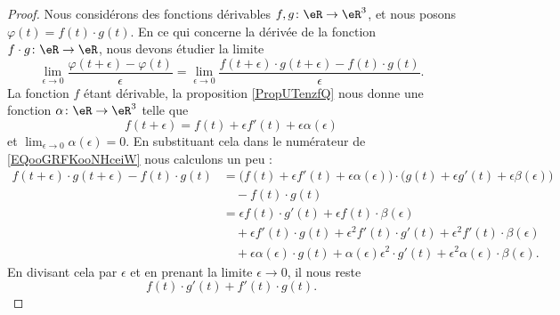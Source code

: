 \begin{proof}
	Nous considérons des fonctions dérivables \( f,g\colon \eR\to \eR^3\), et nous posons \( \varphi(t)=f(t)\cdot g(t)\). En ce qui concerne la dérivée de la fonction \( f\cdot g\colon \eR\to \eR\), nous devons étudier la limite
	\begin{equation}        \label{EQooGRFKooNHceiW}
		\lim_{\epsilon\to 0}\frac{ \varphi(t+\epsilon)-\varphi(t) }{ \epsilon }=\lim_{\epsilon\to 0}\frac{ f(t+\epsilon)\cdot g(t+\epsilon)-f(t)\cdot g(t) }{ \epsilon }.
	\end{equation}
	La fonction \( f\) étant dérivable, la proposition \ref{PropUTenzfQ} nous donne une fonction \( \alpha\colon \eR\to \eR^3\) telle que
	\begin{equation}
		f(t+\epsilon)=f(t)+\epsilon f'(t)+\epsilon\alpha(\epsilon)
	\end{equation}
	et \( \lim_{\epsilon\to 0}\alpha(\epsilon)=0\). En substituant cela dans le numérateur de \eqref{EQooGRFKooNHceiW} nous calculons un peu :
	\begin{subequations}        \label{SUBEQSooMNAZooQjGGpg}
		\begin{align}
			f(t+\epsilon)\cdot g(t+\epsilon)-f(t)\cdot g(t) & =\big( f(t)+\epsilon f'(t)+\epsilon \alpha(\epsilon) \big)\cdot\big( g(t)+\epsilon g'(t)+\epsilon\beta(\epsilon) \big)          \\
			                                                & \quad - f(t)\cdot g(t)                                                                                                          \\
			                                                & =\epsilon f(t)\cdot g'(t)+\epsilon f(t)\cdot \beta(\epsilon)                                                                    \\
			                                                & \quad +\epsilon f'(t)\cdot g(t) + \epsilon^2 f'(t)\cdot g'(t)+\epsilon^2 f'(t)\cdot \beta(\epsilon)                             \\
			                                                & \quad+\epsilon\alpha(\epsilon)\cdot g(t)+\alpha(\epsilon)\epsilon^2\cdot g'(t)+\epsilon^2\alpha(\epsilon)\cdot \beta(\epsilon).
		\end{align}
	\end{subequations}
	En divisant cela par \( \epsilon\) et en prenant la limite \( \epsilon\to 0\), il nous reste
	\begin{equation}
		f(t)\cdot g'(t)+f'(t)\cdot g(t).
	\end{equation}


\end{proof}
